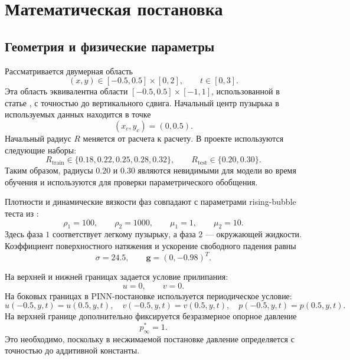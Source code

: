 \documentclass[12pt,a4paper]{article}
\begin{document}
\section{Математическая постановка}

\subsection{Геометрия и физические параметры}

Рассматривается двумерная область
\[
    (x,y)\in[-0.5,0.5]\times[0,2],
    \qquad
    t\in[0,3].
\]
Эта область эквивалентна области
\([-0.5,0.5]\times[-1,1]\), использованной в статье \cite{Buhendwa2021},
с точностью до вертикального сдвига. Начальный центр пузырька в используемых
данных находится в точке
\[
    (x_c,y_c)=(0,0.5).
\]
Начальный радиус \(R\) меняется от расчета к расчету. В проекте используются
следующие наборы:
\[
    R_{\mathrm{train}}\in\{0.18,0.22,0.25,0.28,0.32\},
    \qquad
    R_{\mathrm{test}}\in\{0.20,0.30\}.
\]
Таким образом, радиусы \(0.20\) и \(0.30\) являются невидимыми для модели во
время обучения и используются для проверки параметрического обобщения.

Плотности и динамические вязкости фаз совпадают с параметрами rising-bubble
теста из \cite{Buhendwa2021}:
\[
    \rho_1=100,\qquad \rho_2=1000,
    \qquad
    \mu_1=1,\qquad \mu_2=10.
\]
Здесь фаза \(1\) соответствует легкому пузырьку, а фаза \(2\) --- окружающей
жидкости. Коэффициент поверхностного натяжения и ускорение свободного падения
равны
\[
    \sigma=24.5,
    \qquad
    \mathbf{g}=(0,-0.98)^T.
\]

На верхней и нижней границах задается условие прилипания:
\[
    u=0,\qquad v=0.
\]
На боковых границах в PINN-постановке используется периодическое условие:
\[
    u(-0.5,y,t)=u(0.5,y,t),\quad
    v(-0.5,y,t)=v(0.5,y,t),\quad
    p(-0.5,y,t)=p(0.5,y,t).
\]
На верхней границе дополнительно фиксируется безразмерное опорное давление
\[
    p_\infty^*=1.
\]
Это необходимо, поскольку в несжимаемой постановке давление определяется с
точностью до аддитивной константы.
\end{document}
